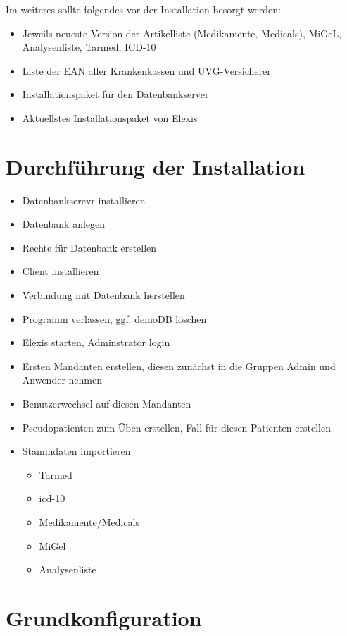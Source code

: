 \documentclass[paper=a4,BCOR8.25mm,twoside]{scrartcl}
\begin{document}
Im weiteres sollte folgendes vor der Installation besorgt werden:
\begin{itemize}
    \item Jeweils neueste Version der Artikelliste (Medikamente, Medicals), MiGeL,  Analysenliste, Tarmed, ICD-10
    \item Liste der EAN aller Krankenkassen und UVG-Versicherer
    \item Installationspaket für den Datenbankserver
    \item Aktuellstes Installationspaket von Elexis

\end{itemize}

\section{Durchführung der Installation}
\label{ablauf}
\begin{itemize}
    \item Datenbankserevr installieren
    \item Datenbank anlegen
    \item Rechte für Datenbank erstellen
    \item Client installieren
    \item Verbindung mit Datenbank herstellen
    \item Programm verlassen, ggf. demoDB löschen
    \item Elexis starten, Adminstrator login
    \item Ersten Mandanten erstellen, diesen zunächst in die Gruppen Admin und Anwender nehmen
    \item Benutzerwechsel auf diesen Mandanten
    \item Pseudopatienten zum Üben erstellen, Fall für diesen Patienten erstellen
    \item Stammdaten importieren
    \begin{itemize}
        \item Tarmed
        \item icd-10
        \item Medikamente/Medicals
        \item MiGel
        \item Analysenliste
    \end{itemize}
\end{itemize}

\section{Grundkonfiguration}
\label{config}
\end{document}
